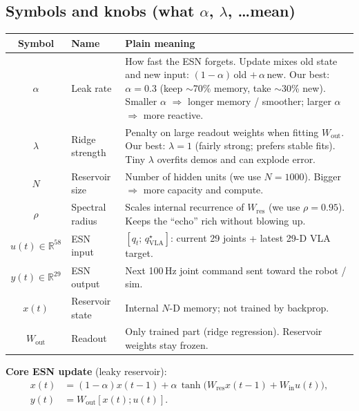 \documentclass[conference]{IEEEtran}
\begin{document}
\subsection{Symbols and knobs (what $\alpha$, $\lambda$, \ldots mean)}
\begin{center}
\scriptsize
\begin{tabularx}{\columnwidth}{@{}c p{} X@{}}
\toprule
\textbf{Symbol} & \textbf{Name} & \textbf{Plain meaning} \\
\midrule
$\alpha$ & Leak rate & How fast the ESN forgets. Update mixes old state and new input: $(1{-}\alpha)\,$old $+\,\alpha\,$new. Our best: $\alpha{=}0.3$ (keep $\sim$70\% memory, take $\sim$30\% new). Smaller $\alpha$ $\Rightarrow$ longer memory / smoother; larger $\alpha$ $\Rightarrow$ more reactive. \\
$\lambda$ & Ridge strength & Penalty on large readout weights when fitting $W_{\mathrm{out}}$. Our best: $\lambda{=}1$ (fairly strong; prefers stable fits). Tiny $\lambda$ overfits demos and can explode error. \\
$N$ & Reservoir size & Number of hidden units (we use $N{=}1000$). Bigger $\Rightarrow$ more capacity and compute. \\
$\rho$ & Spectral radius & Scales internal recurrence of $W_{\mathrm{res}}$ (we use $\rho{=}0.95$). Keeps the ``echo'' rich without blowing up. \\
$u(t)\in\mathbb{R}^{58}$ & ESN input & $[q_t;\,q^\star_{\mathrm{VLA}}]$: current 29 joints + latest 29-D VLA target. \\
$y(t)\in\mathbb{R}^{29}$ & ESN output & Next 100\,Hz joint command sent toward the robot / sim. \\
$x(t)$ & Reservoir state & Internal $N$-D memory; not trained by backprop. \\
$W_{\mathrm{out}}$ & Readout & Only trained part (ridge regression). Reservoir weights stay frozen. \\
\bottomrule
\end{tabularx}
\end{center}

\noindent\textbf{Core ESN update} (leaky reservoir):
\begin{align}
x(t)&=(1-\alpha)x(t-1)+\alpha\,\tanh\!\big(W_{\mathrm{res}}x(t-1)+W_{\mathrm{in}}u(t)\big), \nonumber\\
y(t)&=W_{\mathrm{out}}[x(t);u(t)]. \nonumber
\end{align}
\end{document}

